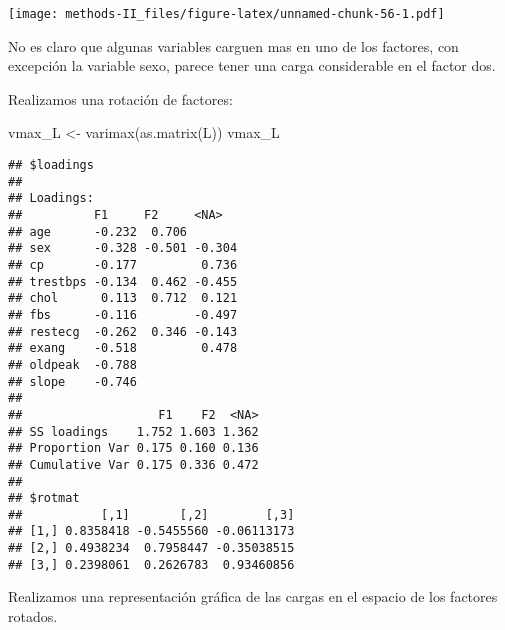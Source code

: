 \documentclass[
]{article}
\newenvironment{Shaded}{\begin{snugshade}}{\end{snugshade}}
\newcommand{\AttributeTok}[1]{\textcolor[rgb]{0.77,0.63,0.00}{#1}}
\newcommand{\DecValTok}[1]{\textcolor[rgb]{0.00,0.00,0.81}{#1}}
\newcommand{\FunctionTok}[1]{\textcolor[rgb]{0.00,0.00,0.00}{#1}}
\newcommand{\NormalTok}[1]{#1}
\newcommand{\OtherTok}[1]{\textcolor[rgb]{0.56,0.35,0.01}{#1}}
\newcommand{\SpecialCharTok}[1]{\textcolor[rgb]{0.00,0.00,0.00}{#1}}
\newcommand{\StringTok}[1]{\textcolor[rgb]{0.31,0.60,0.02}{#1}}
\begin{document}
\texttt{[image: methods-II\_files/figure-latex/unnamed-chunk-56-1.pdf]}

No es claro que algunas variables carguen mas en uno de los factores,
con excepción la variable sexo, parece tener una carga considerable en
el factor dos.

Realizamos una rotación de factores:

\begin{Shaded}
\begin{Highlighting}[]
\NormalTok{vmax\_L }\OtherTok{\textless{}{-}} \FunctionTok{varimax}\NormalTok{(}\FunctionTok{as.matrix}\NormalTok{(L))}
\NormalTok{vmax\_L}
\end{Highlighting}
\end{Shaded}

\begin{verbatim}
## $loadings
## 
## Loadings:
##          F1     F2     <NA>  
## age      -0.232  0.706       
## sex      -0.328 -0.501 -0.304
## cp       -0.177         0.736
## trestbps -0.134  0.462 -0.455
## chol      0.113  0.712  0.121
## fbs      -0.116        -0.497
## restecg  -0.262  0.346 -0.143
## exang    -0.518         0.478
## oldpeak  -0.788              
## slope    -0.746              
## 
##                   F1    F2  <NA>
## SS loadings    1.752 1.603 1.362
## Proportion Var 0.175 0.160 0.136
## Cumulative Var 0.175 0.336 0.472
## 
## $rotmat
##           [,1]       [,2]        [,3]
## [1,] 0.8358418 -0.5455560 -0.06113173
## [2,] 0.4938234  0.7958447 -0.35038515
## [3,] 0.2398061  0.2626783  0.93460856
\end{verbatim}

Realizamos una representación gráfica de las cargas en el espacio de los
factores rotados.

\begin{Shaded}
\end{Shaded}
\end{document}
